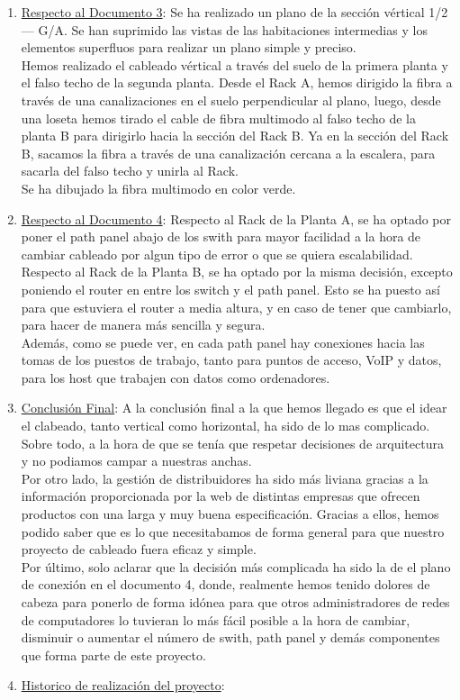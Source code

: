 \documentclass[]{article}
\begin{document}
\begin{enumerate}[label=\alph*]
   \item \underline{Respecto al Documento 3}: Se ha realizado un plano de la sección vértical 1/2 --- G/A. Se han suprimido las vistas de las habitaciones intermedias y los elementos superfluos para realizar un plano simple y preciso. \\
       Hemos realizado el cableado vértical a través del suelo de la primera planta y el falso techo de la segunda planta. Desde el Rack A, hemos dirigido la fibra a través de una canalizaciones en el suelo perpendicular al plano, luego, desde una loseta hemos tirado el cable de fibra multimodo al falso techo de la planta B para dirigirlo hacia la sección del Rack B. Ya en la sección del Rack B, sacamos la fibra a través de una canalización cercana a la escalera, para sacarla del falso techo y unirla al Rack. \\
       Se ha dibujado la fibra multimodo en color verde.
   \item \underline{Respecto al Documento 4}: Respecto al Rack de la Planta A, se ha optado por poner el path panel abajo de los swith para mayor facilidad a la hora de cambiar cableado por algun tipo de error o que se quiera escalabilidad. \\
       Respecto al Rack de la Planta B, se ha optado por la misma decisión, excepto poniendo el router en entre los switch y el path panel. Esto se ha puesto así para que estuviera el router a media altura, y en caso de tener que cambiarlo, para hacer de manera más sencilla y segura. \\
       Además, como se puede ver, en cada path panel hay conexiones hacia las tomas de los puestos de trabajo, tanto para puntos de acceso, VoIP y datos, para los host que trabajen con datos como ordenadores.
   \item \underline{Conclusión Final}: A la conclusión final a la que hemos llegado es que el idear el clabeado, tanto vertical como horizontal, ha sido de lo mas complicado. Sobre todo, a la hora de que se tenía que respetar decisiones de arquitectura y no podiamos campar a nuestras anchas.\\
    Por otro lado, la gestión de distribuidores ha sido más liviana gracias a la información proporcionada por la web de distintas empresas que ofrecen productos con una larga y muy buena especificación. Gracias a ellos, hemos podido saber que es lo que necesitabamos de forma general para que nuestro proyecto de cableado fuera eficaz y simple.\\
    Por último, solo aclarar que la decisión más complicada ha sido la de el plano de conexión en el documento 4, donde, realmente hemos tenido dolores de cabeza para ponerlo de forma idónea para que otros administradores de redes de computadores lo tuvieran lo más fácil posible a la hora de cambiar, disminuir o aumentar el número de swith, path panel y demás componentes que forma parte de este proyecto.
    \item \underline{Historico de realización del proyecto}: 
\end{enumerate}
\end{document}
